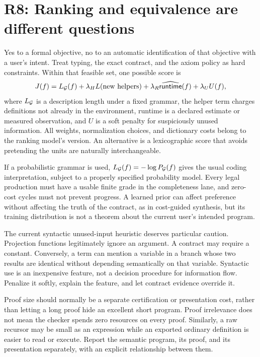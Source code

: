 \section{R8: Ranking and equivalence are different questions}\label{sec:ranking}


\answer Yes to a formal objective, no to an automatic identification of that objective with a user's intent. Treat typing, the exact contract, and the axiom policy as hard constraints. Within that feasible set, one possible score is
\[
 J(f)=L_{\mathcal G}(f)+\lambda_H L(\text{new helpers})
       +\lambda_R\widehat{\mathsf{runtime}}(f)+\lambda_U U(f),
\]
where $L_{\mathcal G}$ is a description length under a fixed grammar, the helper term charges definitions not already in the environment, runtime is a declared estimate or measured observation, and $U$ is a soft penalty for suspiciously unused information. All weights, normalization choices, and dictionary costs belong to the ranking model's version. An alternative is a lexicographic score that avoids pretending the units are naturally interchangeable.

If a probabilistic grammar is used, $L_{\mathcal G}(f)=-\log P_{\mathcal G}(f)$ gives the usual coding interpretation, subject to a properly specified probability model. Every legal production must have a usable finite grade in the completeness lane, and zero-cost cycles must not prevent progress. A learned prior can affect preference without affecting the truth of the contract, as in cost-guided synthesis, but its training distribution is not a theorem about the current user's intended program.\cite{probe}

The current syntactic unused-input heuristic deserves particular caution. Projection functions legitimately ignore an argument. A contract may require a constant. Conversely, a term can mention a variable in a branch whose two results are identical without depending semantically on that variable. Syntactic use is an inexpensive feature, not a decision procedure for information flow. Penalize it softly, explain the feature, and let contract evidence override it.

Proof size should normally be a separate certification or presentation cost, rather than letting a long proof hide an excellent short program. Proof irrelevance does not mean the checker spends zero resources on every proof. Similarly, a raw recursor may be small as an expression while an exported ordinary definition is easier to read or execute. Report the semantic program, its proof, and its presentation separately, with an explicit relationship between them.

